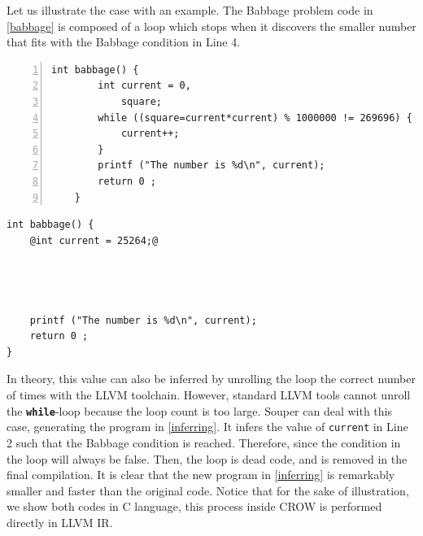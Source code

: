 Let us illustrate the case with an example.
The Babbage problem code in \autoref{babbage} is composed of a loop which stops when it discovers the smaller number that fits with the Babbage condition in Line 4.


{


\begin{minipage}[t]{0.5\linewidth}
    \begin{lstlisting}[numbers=left]
    int babbage() {
        int current = 0,
            square;
        while ((square=current*current) % 1000000 != 269696) {
            current++;
        }
        printf ("The number is %d\n", current);
        return 0 ;
    }
    \end{lstlisting}
\end{minipage}
\begin{minipage}[t]{0.5\linewidth}
    \begin{lstlisting}[]
int babbage() {
    @int current = 25264;@
    
    


    printf ("The number is %d\n", current);
    return 0 ;
}
    \end{lstlisting}
\end{minipage}
}
In theory, this value can also be inferred by unrolling the loop the correct number of times with the LLVM toolchain.
However, standard LLVM tools cannot unroll the \texttt{\textbf{while}}-loop because the loop count is too large.
Souper can deal with this case, generating the program in \autoref{inferring}. It infers the value of \texttt{current} in Line 2 such that the Babbage condition is reached. Therefore, since the condition in the loop will always be false. Then, the loop is dead code, and is removed in the final compilation. It is clear that the new program in \autoref{inferring} is remarkably smaller and faster than the original code. Notice that for the sake of illustration, we show both codes in C language, this process inside CROW is performed directly in LLVM IR.


